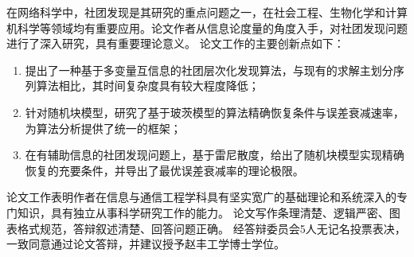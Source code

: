 
\begin{resolution}
    在网络科学中，社团发现是其研究的重点问题之一，在社会工程、生物化学和计算机科学等领域均有重要应用。论文作者从信息论度量的角度入手，对社团发现问题进行了深入研究，具有重要理论意义。
论文工作的主要创新点如下：
\begin{enumerate}
    \item 提出了一种基于多变量互信息的社团层次化发现算法，与现有的求解主划分序列算法相比，其时间复杂度具有较大程度降低；
    \item 针对随机块模型，研究了基于玻茨模型的算法精确恢复条件与误差衰减速率，为算法分析提供了统一的框架；
    \item 在有辅助信息的社团发现问题上，基于雷尼散度，给出了随机块模型实现精确恢复的充要条件，并导出了最优误差衰减率的理论极限。
\end{enumerate}

论文工作表明作者在信息与通信工程学科具有坚实宽广的基础理论和系统深入的专门知识，具有独立从事科学研究工作的能力。
论文写作条理清楚、逻辑严密、图表格式规范，答辩叙述清楚、回答问题正确。
经答辩委员会5人无记名投票表决，一致同意通过论文答辩，并建议授予赵丰工学博士学位。



\end{resolution}
